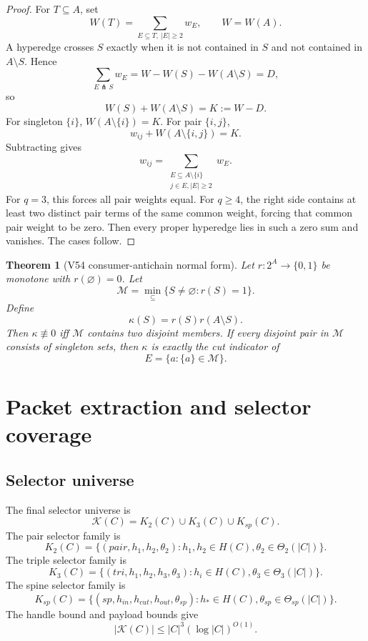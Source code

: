 \documentclass[10.5pt,a4paper]{article}
\newtheorem{theorem}{Theorem}[section]
\newcommand{\cut}{\pitchfork}
\begin{document}
\begin{proof}
For \(T\subseteq A\), set
\[
W(T)=\sum_{E\subseteq T,\ |E|\ge2}w_E,
\qquad W=W(A).
\]
A hyperedge crosses \(S\) exactly when it is not contained in \(S\) and not contained in \(A\setminus S\). Hence
\[
\sum_{E\cut S}w_E=W-W(S)-W(A\setminus S)=D,
\]
so
\[
W(S)+W(A\setminus S)=K:=W-D.
\]
For singleton \(\{i\}\), \(W(A\setminus\{i\})=K\). For pair \(\{i,j\}\),
\[
w_{ij}+W(A\setminus\{i,j\})=K.
\]
Subtracting gives
\[
w_{ij}=\sum_{\substack{E\subseteq A\setminus\{i\}\\ j\in E,
 |E|\ge2}}w_E.
\]
For \(q=3\), this forces all pair weights equal. For \(q\ge4\), the right side contains at least two distinct pair terms of the same common weight, forcing that common pair weight to be zero. Then every proper hyperedge lies in such a zero sum and vanishes. The cases follow.
\end{proof}

\begin{theorem}[V54 consumer-antichain normal form]
Let \(r:2^A\to\{0,1\}\) be monotone with \(r(\varnothing)=0\). Let
\[
\mathcal M=\min_\subseteq\{S\ne\varnothing:r(S)=1\}.
\]
Define
\[
\kappa(S)=r(S)r(A\setminus S).
\]
Then \(\kappa\not\equiv0\) iff \(\mathcal M\) contains two disjoint members. If every disjoint pair in \(\mathcal M\) consists of singleton sets, then \(\kappa\) is exactly the cut indicator of
\[
E=\{a:\{a\}\in\mathcal M\}.
\]
\end{theorem}

\section{Packet extraction and selector coverage}

\subsection{Selector universe}
The final selector universe is
\[
\boxed{\mathcal K(C)=K_2(C)\cup K_3(C)\cup K_{sp}(C).}
\]
The pair selector family is
\[
K_2(C)=\{(pair,h_1,h_2,\theta_2):h_1,h_2\in H(C),\theta_2\in\Theta_2(|C|)\}.
\]
The triple selector family is
\[
K_3(C)=\{(tri,h_1,h_2,h_3,\theta_3):h_i\in H(C),\theta_3\in\Theta_3(|C|)\}.
\]
The spine selector family is
\[
K_{sp}(C)=\{(sp,h_{in},h_{cut},h_{out},\theta_{sp}):h_*\in H(C),\theta_{sp}\in\Theta_{sp}(|C|)\}.
\]
The handle bound and payload bounds give
\[
|\mathcal K(C)|\le |C|^3(\log |C|)^{O(1)}.
\]
\end{document}
